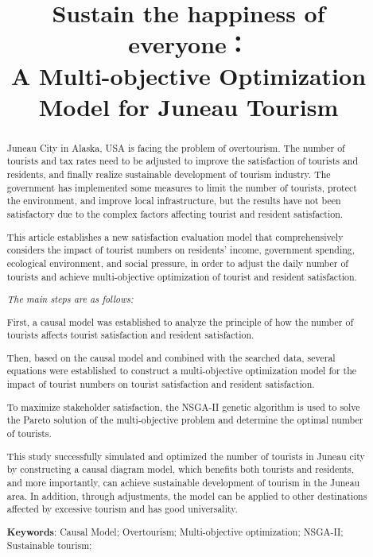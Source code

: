 \documentclass[12pt]{article}  %
\title{Sustain the happiness of everyone：\\ A Multi-objective Optimization Model for Juneau Tourism}  %
\begin{document}
 
 \begin{abstract}
Juneau City in Alaska, USA is facing the problem of overtourism. The number of tourists and tax rates need to be adjusted to improve the satisfaction of tourists and residents, and finally realize sustainable development of tourism industry. The government has implemented some measures to limit the number of tourists, protect the environment, and improve local infrastructure, but the results have not been satisfactory due to the complex factors affecting tourist and resident satisfaction.
     
This article establishes a new satisfaction evaluation model that comprehensively considers the impact of tourist numbers on residents' income, government spending, ecological environment, and social pressure, in order to adjust the daily number of tourists and achieve multi-objective optimization of tourist and resident satisfaction.

\textit{The main steps are as follows:}
 
First, a causal model was established to analyze the principle of how the number of tourists affects tourist satisfaction and resident satisfaction.

 Then, based on the causal model and combined with the searched data, several equations were established to construct a multi-objective optimization model for the impact of tourist numbers on tourist satisfaction and resident satisfaction.

 To maximize stakeholder satisfaction, the NSGA-II genetic algorithm is used to solve the Pareto solution of the multi-objective problem and determine the optimal number of tourists.
 
 This study successfully simulated and optimized the number of tourists in Juneau city by constructing a causal diagram model, which benefits both tourists and residents, and more importantly, can achieve sustainable development of tourism in the Juneau area. In addition, through adjustments, the model can be applied to other destinations affected by excessive tourism and has good universality.
     
     \vspace{5pt}  %
     \textbf{Keywords}: Causal Model; Overtourism; Multi-objective optimization; NSGA-II; Sustainable tourism;
 
 \end{abstract}
 
\end{document}
